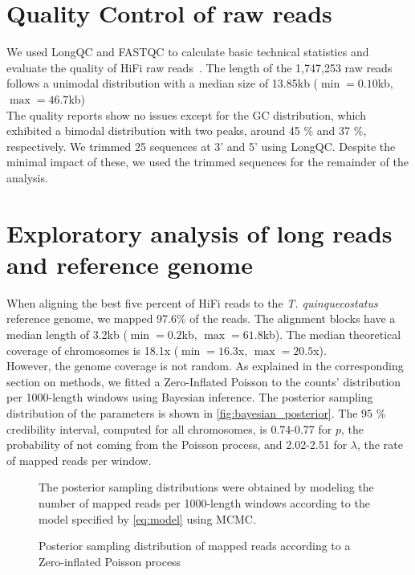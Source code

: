 \section*{Quality Control of raw reads}

We used LongQC and FASTQC to calculate basic technical statistics and evaluate the quality of \ac{HiFi} raw reads~\cite{fukasawaLongQCQualityControl2020,BabrahamBioinformaticsFastQC}. The length of the 1,747,253 raw reads follows a unimodal distribution with a median size of 13.85kb ($\min = 0.10$kb, $\max = 46.7$kb) \\

The quality reports show no issues except for the GC distribution, which exhibited a bimodal distribution with two peaks, around 45 \% and 37 \%, respectively. We trimmed 25 sequences at 3' and 5' using LongQC. Despite the minimal impact of these, we used the trimmed sequences for the remainder of the analysis. \\

\section*{Exploratory analysis of long reads and reference genome}

When aligning the best five percent of \ac{HiFi} reads to the \textit{T. quinquecostatus} reference genome, we mapped 97.6\% of the reads. The alignment blocks have a median length of 3.2kb ($\min = 0.2$kb, $\max = 61.8$kb). The median theoretical coverage of chromosomes is 18.1x ($\min = 16.3$x, $\max = 20.5$x). \\

However, the genome coverage is not random. As explained in the corresponding section on methods, we fitted a Zero-Inflated Poisson to the counts' distribution per 1000-length windows using Bayesian inference. The posterior sampling distribution of the parameters is shown in \autoref{fig:bayesian_posterior}. The 95 \% credibility interval, computed for all chromosomes, is 0.74-0.77 for $p$, the probability of not coming from the Poisson process, and 2.02-2.51 for $\lambda$, the rate of mapped reads per window. \\

\graphicspath{{gfx/}}
\begin{figure}
\begin{center}
    
    \caption{Posterior sampling distribution of mapped reads according to a Zero-inflated Poisson process}    
    \label{fig:bayesian_posterior}    
\end{center}
\footnotesize
The posterior sampling distributions were obtained by modeling the number of mapped reads per 1000-length windows according to the model specified by \eqref{eq:model} using \ac{MCMC}.   
\end{figure}    

